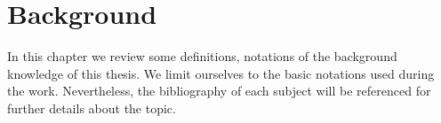 \chapter{Background}
\label{chap:background}

In this chapter we review some definitions, notations of the background knowledge of this thesis. We limit ourselves to the basic notations used during the work. Nevertheless, the bibliography of each subject will be referenced for further details about the topic.


%
%
%
